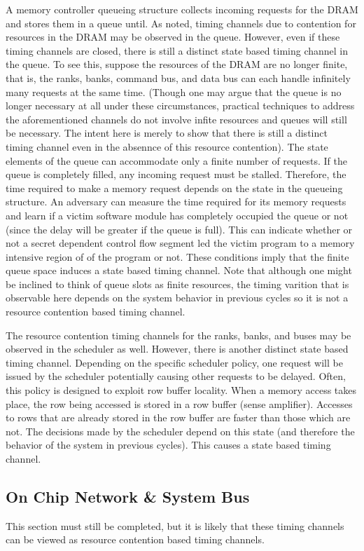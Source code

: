 A memory controller queueing structure collects incoming requests for the DRAM 
and stores them in a queue until. As noted, timing channels due to contention 
for resources in the
DRAM may be observed in the queue. However, even if these timing channels are 
closed, there is still a distinct state based timing channel in the queue. To 
see this, suppose the resources of the DRAM are no longer finite, that is, the 
ranks, banks, command bus, and data bus can each handle infinitely many 
requests at the same time. (Though one may argue that the queue is no longer 
necessary at all under these circumstances, practical techniques to address the 
aforementioned channels do not involve infite resources and queues will still 
be necessary. The intent here is merely to show that there is still a distinct 
timing channel even in the absennce of this resource contention).
The state elements of the queue can accommodate only a finite number of 
requests. If the queue is completely filled, any incoming request must be 
stalled. Therefore, the time required to make a memory request depends on the 
state in the queueing structure. An adversary can measure the time required for 
its memory requests and learn if a victim software module has completely 
occupied the queue or not (since the delay will be greater if the queue is 
full). This can indicate whether or not a secret dependent control flow segment 
led the victim program to a memory intensive region of of the program or not.  
These conditions imply that the finite queue space induces a state based timing 
channel. Note that although one might be inclined to think of queue slots as 
finite resources, the timing varition that is observable here depends on the 
system behavior in previous cycles so it is not a resource contention based 
timing channel.

The resource contention timing channels for the ranks, banks, and buses may be 
observed in the scheduler as well. However, there is another distinct state 
based timing channel. Depending on the specific scheduler policy, one request 
will be issued by the scheduler potentially causing other requests to be 
delayed.  Often, this policy is designed to exploit row buffer locality. When a 
memory access takes place, the row being accessed is stored in a row buffer 
(sense amplifier). Accesses to rows that are already stored in the row buffer 
are faster than those which are not. The decisions made by the scheduler depend 
on this state (and therefore the behavior of the system in previous cycles).  
This causes a state based timing channel.

\subsection{On Chip Network \& System Bus}
This section must still be completed, but it is likely that these timing 
channels can be viewed as resource contention based timing channels.
